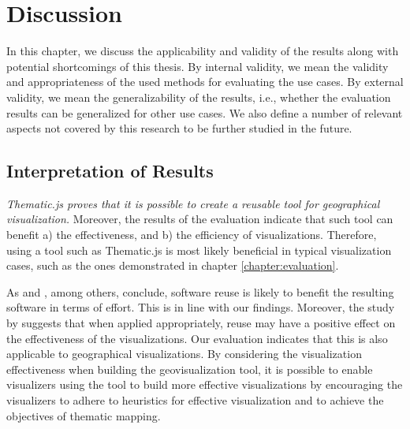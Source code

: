 
\chapter{Discussion}
\label{chapter:discussion}

In this chapter, we discuss the applicability and validity of the results along with potential shortcomings of this thesis. By internal validity, we mean the validity and appropriateness of the used methods for evaluating the use cases. By external validity, we mean the generalizability of the results, i.e., whether the evaluation results can be generalized for other use cases. We also define a number of relevant aspects not covered by this research to be further studied in the future.

\section{Interpretation of Results}

\emph{Thematic.js proves that it is possible to create a reusable tool for geographical visualization.} Moreover, the results of the evaluation indicate that such tool can benefit a) the effectiveness, and b) the efficiency of visualizations. Therefore, using a tool such as Thematic.js is most likely beneficial in typical visualization cases, such as the ones demonstrated in chapter \ref{chapter:evaluation}.

As \citet{boehm_managing_1999} and \citet{mohagheghi_quality_2007}, among others, conclude, software reuse is likely to benefit the resulting software in terms of effort. This is in line with our findings. Moreover, the study by \citet{bostock_protovis:_2009} suggests that when applied appropriately, reuse may have a positive effect on the effectiveness of the visualizations. Our evaluation indicates that this is also applicable to geographical visualizations. By considering the visualization effectiveness when building the geovisualization tool, it is possible to enable visualizers using the tool to build more effective visualizations by encouraging the visualizers to adhere to heuristics for effective visualization and to achieve the objectives of thematic mapping.


